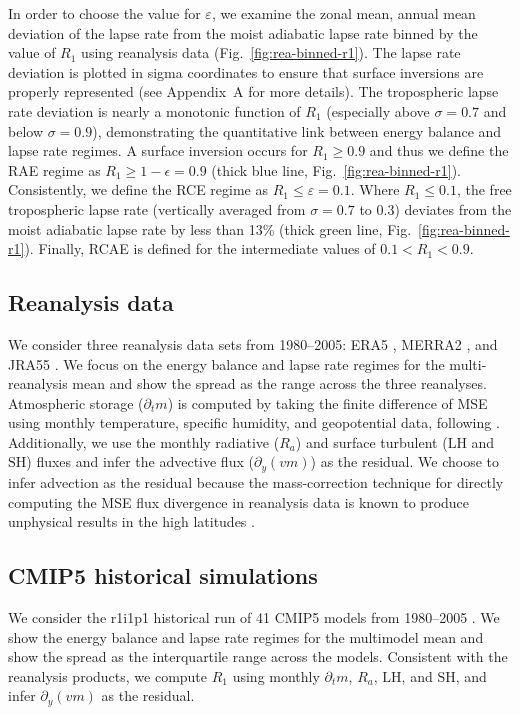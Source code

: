 \documentclass{ametsocV5}
\begin{document}
    In order to choose the value for $\varepsilon$, we examine the zonal mean, annual mean deviation of the lapse rate from the moist adiabatic lapse rate binned by the value of $R_1$ using reanalysis data (Fig.~\ref{fig:rea-binned-r1}). The lapse rate deviation is plotted in sigma coordinates to ensure that surface inversions are properly represented (see Appendix~A for more details). The tropospheric lapse rate deviation is nearly a monotonic function of $R_1$ (especially above $\sigma=0.7$ and below $\sigma=0.9$), demonstrating the quantitative link between energy balance and lapse rate regimes. A surface inversion occurs for $R_1 \ge 0.9$ and thus we define the RAE regime as $R_1\ge1-\epsilon=0.9$ (thick blue line, Fig.~\ref{fig:rea-binned-r1}). Consistently, we define the RCE regime as $R_1\le\varepsilon=0.1$. Where $R_1\le 0.1$, the free tropospheric lapse rate (vertically averaged from $\sigma=0.7$ to 0.3) deviates from the moist adiabatic lapse rate by less than 13\% (thick green line, Fig.~\ref{fig:rea-binned-r1}). Finally, RCAE is defined for the intermediate values of $0.1<R_1<0.9$.

    \subsection{Reanalysis data}\label{subsec:reanalysis}
    We consider three reanalysis data sets from 1980--2005: ERA5 \citep{hersbach2020}, MERRA2 \citep{gelaro2017}, and JRA55 \citep{kobayashi2015}. We focus on the energy balance and lapse rate regimes for the multi-reanalysis mean and show the spread as the range across the three reanalyses. Atmospheric storage ($\partial_t m$) is computed by taking the finite difference of MSE using monthly temperature, specific humidity, and geopotential data, following \cite{donohoe2013}. Additionally, we use the monthly radiative ($R_a$) and surface turbulent ($\mathrm{LH}$ and $\mathrm{SH}$) fluxes and infer the advective flux ($\partial_y (vm)$) as the residual. We choose to infer advection as the residual because the mass-correction technique for directly computing the MSE flux divergence in reanalysis data is known to produce unphysical results in the high latitudes \citep{porter2010}. 

    \subsection{CMIP5 historical simulations}
    We consider the r1i1p1 historical run of 41 CMIP5 models from 1980--2005 \citep[Table~B1,][]{taylor2012}. We show the energy balance and lapse rate regimes for the multimodel mean and show the spread as the interquartile range across the models. Consistent with the reanalysis products, we compute $R_1$ using monthly $\partial_t m$, $R_a$, $\mathrm{LH}$, and $\mathrm{SH}$, and infer $\partial_y (vm) $ as the residual.
\end{document}
